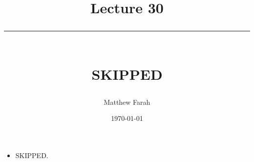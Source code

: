 \documentclass{article}
\date{
	\vspace{-.75em}
	{\large \today}
}
\title{
	\vspace*{-1.5em}
	{\Huge Lecture 30} \\
	\vspace{-1em}
	\rule{\textwidth/4}{.01em} \\
	\vspace{-.25em}
	{\Large SKIPPED}
	\vspace{-.75em}
}
\author{
	{\large Matthew Farah}
}
\begin{document}
\maketitle
\pagestyle{fancy}

\fi


\begin{itemize}
	\item SKIPPED.
\end{itemize}

\ifdefined\iscombined
	\newpage
\else
	
\end{document}
